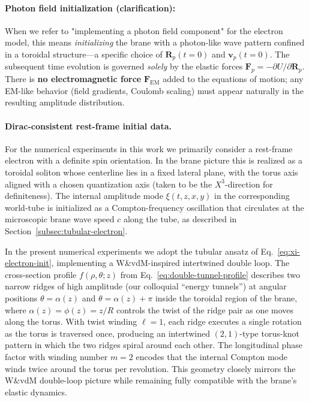 \paragraph{Photon field initialization (clarification):}
When we refer to "implementing a photon field component" for the electron model, this means \emph{initializing} the brane with a photon-like wave pattern confined in a toroidal structure—a specific choice of $\mathbf{R}_p(t=0)$ and $\mathbf{v}_p(t=0)$. The subsequent time evolution is governed \emph{solely} by the elastic forces $\mathbf{F}_p = -\partial U/\partial \mathbf{R}_p$. There is \textbf{no electromagnetic force} $\mathbf{F}_\text{EM}$ added to the equations of motion; any EM-like behavior (field gradients, Coulomb scaling) must appear naturally in the resulting amplitude distribution.

\paragraph{Dirac-consistent rest-frame initial data.}

For the numerical experiments in this work we primarily consider a
rest-frame electron with a definite spin orientation. In the brane
picture this is realized as a toroidal soliton whose centerline lies
in a fixed lateral plane, with the torus axis aligned with a chosen
quantization axis (taken to be the $X^3$-direction for definiteness).
The internal amplitude mode $\xi(t,z,x,y)$ in the corresponding
world-tube is initialized as a Compton-frequency oscillation that
circulates at the microscopic brane wave speed $c$ along the tube, as
described in Section~\ref{subsec:tubular-electron}.

In the present numerical experiments we adopt the tubular ansatz
of Eq.~\eqref{eq:xi-electron-init}, implementing a W\&vdM-inspired
intertwined double loop. The cross-section profile
$f(\rho,\theta;z)$ from Eq.~\eqref{eq:double-tunnel-profile} describes
two narrow ridges of high amplitude (our colloquial ``energy tunnels'')
at angular positions $\theta = \alpha(z)$ and
$\theta = \alpha(z)+\pi$ inside the toroidal region of the brane, where
$\alpha(z) = \phi(z) = z/R$ controls the twist of the ridge pair as one
moves along the torus. With twist winding $\ell=1$, each ridge executes
a single rotation as the torus is traversed once, producing an
intertwined $(2,1)$-type torus-knot pattern in which the two ridges
spiral around each other. The longitudinal phase factor with
winding number $m=2$ encodes that the internal Compton mode winds twice
around the torus per revolution. This geometry closely mirrors the
W\&vdM double-loop picture while remaining fully compatible with the
brane's elastic dynamics.

